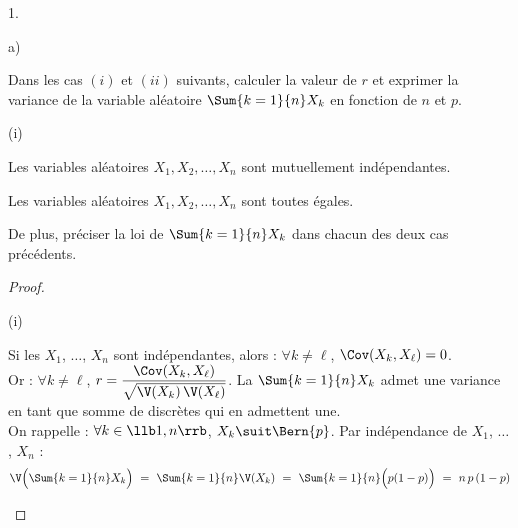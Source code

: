 \documentclass[11pt]{article}%
\begin{document}
\begin{noliste}{1.}
  \setlength{\itemsep}{4mm}
  \item
  \begin{noliste}{a)}
    \setlength{\itemsep}{2mm}
    \item Dans les cas $(i)$ et $(ii)$ suivants, calculer la valeur 
    de $r$ et exprimer la variance de la variable aléatoire $ 
    \Sum{k=1}{n} X_k$ en fonction de $n$ et $p$.
    \begin{nonoliste}{(i)}
      \item Les variables aléatoires $X_1, X_2, \ldots, X_n$ sont 
      mutuellement indépendantes.
      
      \item Les variables aléatoires $X_1, X_2, \ldots, X_n$ sont 
      toutes égales.
    \end{nonoliste}
    
    De plus, préciser la loi de $\Sum{k=1}{n} X_k$ dans chacun 
    des deux cas précédents.
    
    \begin{proof}~
      \begin{nonoliste}{(i)}
      \item Si les \var $X_1$, $\ldots$, $X_n$ sont indépendantes,
        alors : $\forall k \neq \ell$, $\Cov(X_k,X_\ell)=0$.\\[.1cm]
        Or : $\forall k \neq \ell$, $r = \dfrac{\Cov(X_k,X_\ell)}{
          \sqrt{\V(X_k) \, \V(X_\ell)}}$.%
        La \var $\Sum{k=1}{n} X_k$ admet une variance en tant que
        somme de \var discrètes qui en admettent une.\\
        On rappelle : $\forall k \in \llb 1,n \rrb$, $X_k \suit
        \Bern{p}$. Par indépendance de $X_1$, $\ldots$, $X_n$ :
        \[
          \V\Big( \Sum{k=1}{n} X_k\Big) \ = \ \Sum{k=1}{n} \V(X_k)
          \ = \ \Sum{k=1}{n} \Big(p (1-p)\Big) \ = \ n \, p \, (1-p)
        \]
        

\end{nonoliste}
\end{proof}
\end{noliste}
\end{noliste}
\end{document}
